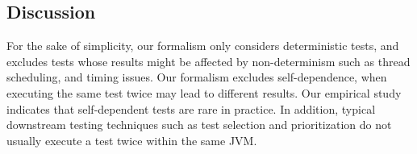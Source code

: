 \subsection{Discussion}
\label{sec:formaldiscussion}

For the sake of simplicity, our formalism only
considers deterministic tests,
and excludes tests whose results might be affected by
non-determinism such as thread scheduling,
and timing issues.
Our formalism excludes self-dependence, 
when executing the same test twice
may lead to different results. Our empirical study
indicates that self-dependent tests
are rare in practice. In addition, typical
downstream testing techniques such as test selection and
prioritization do not usually execute a test twice within the same JVM.



